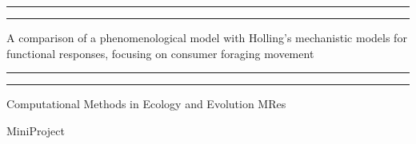 \documentclass[11pt, a4paper, titlepage]{article}
\begin{document}
\begin{titlepage} %
	
	\centering %
	
	\scshape %
	
	\vspace*{\baselineskip} %
	
	
	
	
	\rule{\textwidth}{1.6pt}\vspace*{-\baselineskip}\vspace*{2pt} %
	
	\rule{\textwidth}{0.4pt} %
	
	\vspace{0.75\baselineskip} %
	
	{\LARGE A comparison of a phenomenological model with Holling's mechanistic models for functional responses, focusing on consumer foraging movement\\} %
	
	\vspace{0.75\baselineskip} %
	
	\rule{\textwidth}{0.4pt}\vspace*{-\baselineskip}\vspace{3.2pt} %
	
	\rule{\textwidth}{1.6pt} %
	
	\vspace{2\baselineskip} %
	
	
	
	
	Computational Methods in Ecology and Evolution MRes
	\vspace{0.5\baselineskip}
	
	 MiniProject %
	
	\vspace*{3\baselineskip} %
	

\end{titlepage}
\end{document}

